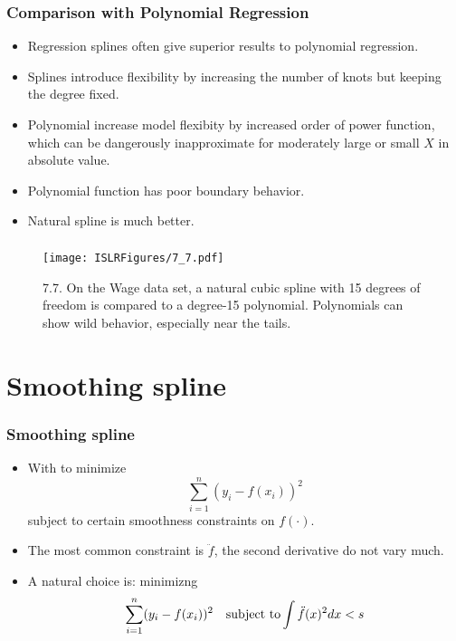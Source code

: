\documentclass{beamer}
\begin{document}
                     \begin{frame}
                     	\frametitle{Comparison with Polynomial Regression}
                     	\begin{itemize}
                     		\item Regression splines often give superior results to polynomial regression.
                     		\item Splines introduce
                     		flexibility by increasing the number of knots but keeping the degree
                     		fixed.
                     		\item Polynomial increase model flexibity by increased order of power function, which 
                     		can be dangerously inapproximate for moderately large or small $X$ in absolute value.
                     		\item Polynomial function has poor boundary behavior.
                     		\item Natural spline is much better. 
                     		
                     	\end{itemize}
                     \end{frame} 
                     
                       \begin{frame}
                       	\frametitle{}
                       	\begin{figure}
                       		\centering
                       		
                       		\centering
                       		\texttt{[image: ISLRFigures/7\_7.pdf]}
                       		\caption{\scriptsize 7.7. On the Wage data set, a natural cubic spline with 15 degrees
                       			of freedom is compared to a degree-15 polynomial. Polynomials can show wild
                       			behavior, especially near the tails.
                       		}
                       	\end{figure}
                       \end{frame}
\section{Smoothing spline}

\begin{frame}
	\frametitle{Smoothing spline}
	\begin{itemize}
		\item With to minimize
		$$ \sum_{i=1}^n (y_i - f(x_i))^2$$ 
		subject to certain smoothness constraints on $f(\cdot)$.
		\item  The most common constraint is $\ddot{f}$, the second derivative do not vary much. 
	
		\item  A natural choice is: minimizng 
		$$ \sum_{i=1}^n (y_i - f(x_i))^2\quad \hbox{subject to} \int \ddot f(x)^2 dx < s$$ 
	 
	
	\end{itemize}
\end{frame} 
\end{document}
